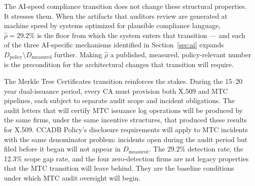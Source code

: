 \documentclass[10pt,twocolumn,letterpaper]{article}
\begin{document}
The AI-speed compliance transition does not change these structural
properties. It stresses them. When the artifacts that auditors review
are generated at machine speed by systems optimized for plausible
compliance language, $\hat{\rho} = 29.2\%$ is the floor from which
the system enters that transition --- and each of the three AI-specific
mechanisms identified in Section~\ref{sec:ai} expands
$D_\text{policy} \setminus D_\text{measured}$ further. Making
$\hat{\rho}$ a published, measured, policy-relevant number is the
precondition for the architectural changes that transition will require.

The Merkle Tree Certificates transition reinforces the stakes. During
the 15--20 year dual-issuance period, every CA must provision both
X.509 and MTC pipelines, each subject to separate audit scope and
incident obligations. The audit letters that will certify MTC issuance
log operations will be produced by the same firms, under the same
incentive structures, that produced these results for X.509. CCADB
Policy's disclosure requirements will apply to MTC incidents with the
same denominator problem: incidents open during the audit period but
filed before it began will not appear in $D_\text{measured}$. The
29.2\% detection rate, the 12.3\% scope gap rate, and the
four zero-detection firms are not legacy properties that the MTC
transition will leave behind. They are the baseline conditions under
which MTC audit oversight will begin.
\end{document}
